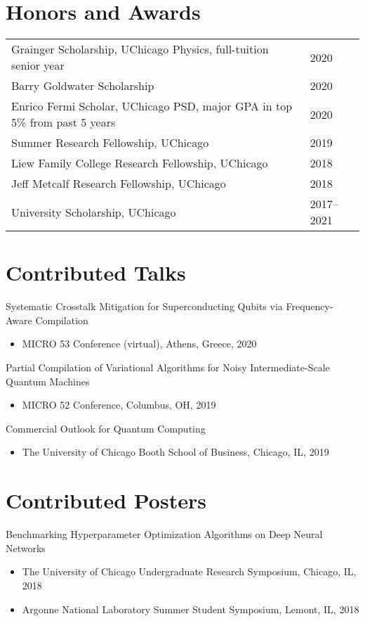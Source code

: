 \documentclass[letterpaper, 11pt]{article}
\begin{document}
\section{Honors and Awards}
\begin{tabular}{@{} L{14.5cm} @{} R{2.01cm} @{}}
  Grainger Scholarship, UChicago Physics, full-tuition senior year & 2020\\
  Barry Goldwater Scholarship & 2020\\
  Enrico Fermi Scholar, UChicago PSD, major GPA in top 5\% from past 5 years & 2020\\
  Summer Research Fellowship, UChicago & 2019\\
  Liew Family College Research Fellowship, UChicago & 2018\\
  Jeff Metcalf Research Fellowship, UChicago & 2018 \\
  University Scholarship, UChicago & 2017--2021\\
\end{tabular}

\section{Contributed Talks}
Systematic Crosstalk Mitigation for Superconducting Qubits via Frequency-Aware Compilation\\
\begin{itemize}
  \item MICRO 53 Conference (virtual), Athens, Greece, 2020\\
\end{itemize}
Partial Compilation of Variational Algorithms for Noisy Intermediate-Scale Quantum Machines\\
\begin{itemize}
\item MICRO 52 Conference, Columbus, OH, 2019\\
\end{itemize}
Commercial Outlook for Quantum Computing\\
\begin{itemize}
\item The University of Chicago Booth School of Business, Chicago, IL, 2019\\
\end{itemize}

\section{Contributed Posters}
Benchmarking Hyperparameter Optimization Algorithms on Deep Neural Networks\\
\begin{itemize}
\item The University of Chicago Undergraduate Research Symposium, Chicago, IL, 2018\\
\item Argonne National Laboratory Summer Student Symposium, Lemont, IL, 2018\\
\end{itemize}
\end{document}

